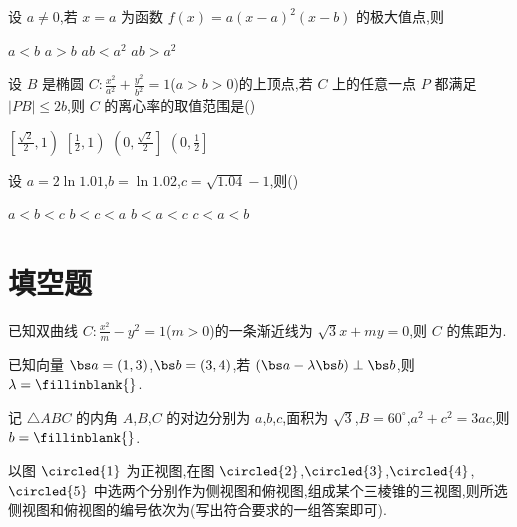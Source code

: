\begin{problem}
设 \(a\ne 0\),若 \(x=a\) 为函数 \(f(x)=a(x-a)^2(x-b)\) 的极大值点,则

\choices
    {\(a<b\)}
    {\(a>b\)}
    {\(ab<a^2\)}
    {\(ab>a^2\)}

\end{problem}

\begin{problem}
设 \(B\) 是椭圆 \(C:\frac{x^2}{a^2}+\frac{y^2}{b^2}=1\)(\(a>b>0\))的上顶点,若 \(C\) 上的任意一点 \(P\) 都满足 \(|PB|\le 2b\),则 \(C\) 的离心率的取值范围是(\quad)

\choices
    {\(\left[ \frac{\sqrt2}{2},1 \right)\)}
    {\(\left[ \frac{1}{2},1 \right)\)}
    {\(\left( 0,\frac{\sqrt2}{2} \right]\)}
    {\(\left( 0,\frac{1}{2} \right]\)}

\end{problem}

\begin{problem}
设 \(a=2\ln 1.01\),\(b=\ln 1.02\),\(c=\sqrt{1.04}-1\),则(\quad)

\choices
    {\(a<b<c\)}
    {\(b<c<a\)}
    {\(b<a<c\)}
    {\(c<a<b\)}

\end{problem}

\section{填空题}

\begin{problem}
已知双曲线 \(C:\frac{x^2}{m}-y^2=1\)(\(m>0\))的一条渐近线为 \(\sqrt3 x+my=0\),则 \(C\) 的焦距为\fillinblank{}.
\end{problem}

\begin{problem}
已知向量 \(\bs a=(1,3)\),\(\bs b=(3,4)\),若 \((\bs a-\lambda \bs b)\perp \bs b\),则 \(\lambda=\fillinblank{}\).
\end{problem}

\begin{problem}
记 \(\triangle ABC\) 的内角 \(A\),\(B\),\(C\) 的对边分别为 \(a\),\(b\),\(c\),面积为 \(\sqrt3\),\(B=60^\circ\),\(a^2+c^2=3ac\),则 \(b=\fillinblank{}\).
\end{problem}

\begin{problem}
以图 \(\circled{1}\) 为正视图,在图 \(\circled{2}\),\(\circled{3}\),\(\circled{4}\),\(\circled{5}\) 中选两个分别作为侧视图和俯视图,组成某个三棱锥的三视图,则所选侧视图和俯视图的编号依次为\fillinblank{}(写出符合要求的一组答案即可).

\end{problem}

